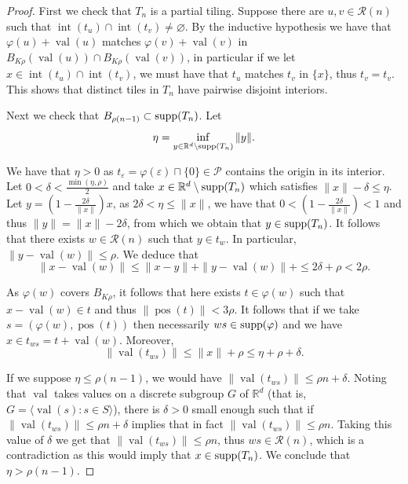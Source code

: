 \documentclass{article}
\theoremstyle{definition}
\theoremstyle{definition}
\newcommand{\R}{\mathbb{R}}
\newcommand{\RR}{\mathbb{R}}
\newcommand{\PP}{\mathcal{P}}
\newcommand{\norm}[1]{\|{#1}\|}
\newcommand{\val}{\operatorname{val}}
\newcommand{\pos}{\operatorname{pos}}
\newcommand{\supp}{\textnormal{supp}}
\begin{document}
    \begin{proof}
        First we check that $T_n$ is a partial tiling. Suppose there are $u,v \in \mathcal{R}(n)$ such that $\operatorname{int}(t_u) \cap \operatorname{int}(t_v) \neq \varnothing$. By the inductive hypothesis we have that $\varphi(u) + \val(u)$ matches $\varphi(v) + \val(v)$ in $B_{K\rho}(\val(u))\cap B_{K\rho}(\val(v))$, in particular if we let $x \in \operatorname{int}(t_u) \cap \operatorname{int}(t_v)$, we must have that $t_u$ matches $t_v$ in $\{x\}$, thus $t_v = t_v$. This shows that distinct tiles in $T_n$ have pairwise disjoint interiors.

        Next we check that $B_{\rho (n-1)}\subset \supp(T_n)$. Let \[ \eta = \inf_{y \in \RR^d\setminus \supp(T_{n})} \norm{y}.  \]
     
     We have that $\eta>0$ as $t_{\varepsilon} = \varphi(\varepsilon) \sqcap \{0\} \in \PP$ contains the origin in its interior. Let $0 <\delta<\frac{\min(\eta,\rho)}{2}$ and take $x \in \R^d\setminus \supp(T_{n})$ which satisfies $\norm{x} - \delta \leq \eta$. Let $y = (1-\frac{2\delta}{\norm{x}})x$, as $2\delta<\eta\leq \norm{x}$, we have that $0 < (1-\frac{2\delta}{\norm{x}})<1$ and thus $\norm{y} = \norm{x}-2\delta$, from which we obtain that $y \in \supp(T_{n})$. It follows that there exists $w \in \mathcal{R}(n)$ such that $y \in t_w$. In particular, $\norm{y-\val(w)}\leq \rho$. We deduce that \[ \norm{x-\val(w)} \leq \norm{x-y}+\norm{y-\val(w)}+ \leq 2\delta+\rho <2\rho.   \]

    As $\varphi(w)$ covers $B_{K\rho}$, it follows that here exists $t \in \varphi(w)$ such that $x-\val(w)\in t$ and thus $\norm{\pos(t)} < 3\rho$. It follows that if we take $s = (\varphi(w),\pos(t))$ then necessarily $ws\in \supp(\varphi)$ and we have $x \in t_{ws} = t+\val(w)$. Moreover, \[\norm{\val(t_{ws})} \leq \norm{x}+\rho \leq \eta + \rho+\delta.\]

    If we suppose $\eta \leq \rho(n-1)$, we would have $\norm{\val(t_{ws})} \leq \rho n + \delta$. Noting that $\val$ takes values on a discrete subgroup $G$ of $\RR^d$ (that is, $G =\langle \val(s): s \in S\rangle$), there is $\delta>0$ small enough such that if $\norm{\val(t_{ws})} \leq \rho n + \delta$ implies that in fact $\norm{\val(t_{ws})} \leq \rho n$. Taking this value of $\delta$ 
     we get that $\norm{\val(t_{ws})} \leq \rho n$, thus $ws \in \mathcal{R}(n)$, which is a contradiction as this would imply that $x \in \supp(T_n)$. We conclude that $\eta > \rho(n-1)$.
    \end{proof}
\end{document}
